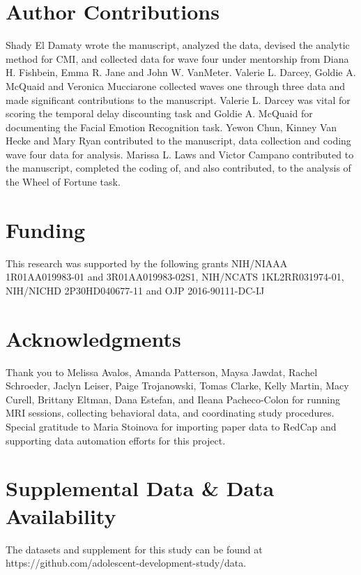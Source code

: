 \documentclass[utf8]{stylesheet}
\begin{document}
\section*{Author Contributions}
Shady El Damaty wrote the manuscript, analyzed the data, devised the analytic method for CMI, and collected data for wave four under mentorship from Diana H. Fishbein, Emma R. Jane and John W. VanMeter. Valerie L. Darcey, Goldie A. McQuaid and Veronica Mucciarone collected waves one through three data and made significant contributions to the manuscript. Valerie L. Darcey was vital for scoring the temporal delay discounting task and Goldie A. McQuaid for documenting the Facial Emotion Recognition task. Yewon Chun, Kinney Van Hecke and Mary Ryan contributed to the manuscript, data collection and coding wave four data for analysis. Marissa L. Laws and Victor Campano contributed to the manuscript, completed the coding of, and also contributed, to the analysis of the Wheel of Fortune task.

\section*{Funding}
This research was supported by the following grants NIH/NIAAA 1R01AA019983-01 and 3R01AA019983-02S1, NIH/NCATS 1KL2RR031974-01, 
NIH/NICHD 2P30HD040677-11 and OJP 2016-90111-DC-IJ


\section*{Acknowledgments}
Thank you to Melissa Avalos, Amanda Patterson, Maysa Jawdat, Rachel Schroeder, Jaclyn Leiser, Paige Trojanowski, Tomas Clarke, Kelly Martin, Macy Curell, Brittany Eltman, Dana Estefan, and Ileana Pacheco-Colon for running MRI sessions, collecting behavioral data, and coordinating study procedures. Special gratitude to Maria Stoinova for importing paper data to RedCap and supporting data automation efforts for this project.

\section*{Supplemental Data \& Data Availability}
The datasets and supplement for this study can be found at https://github.com/adolescent-development-study/data.
\newpage
\end{document}
